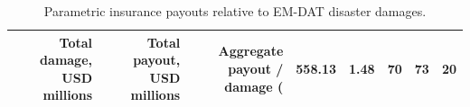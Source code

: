 \begin{table}
\caption{Parametric insurance payouts relative to EM-DAT disaster damages.}
\label{tab:payouts_vs_damages}
\begin{tabular}{rrrrrr}
\toprule
Total damage, USD millions & Total payout, USD millions & Aggregate payout / damage (%
 & 558.13 & 1.48 & 70 & 73 & 20 \\
\bottomrule
\end{tabular}
\end{table}
